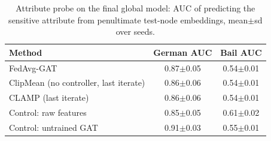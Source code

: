 \begin{table}[t]
\centering
\footnotesize
\caption{Attribute probe on the final global model: AUC of predicting the sensitive attribute from penultimate test-node embeddings, mean$\pm$sd over seeds.}
\label{tab:privacy_probe}
\begin{tabular}{lcc}
\toprule
Method & German AUC & Bail AUC \\
\midrule
FedAvg-GAT & 0.87$\pm$0.05 & 0.54$\pm$0.01 \\
ClipMean (no controller, last iterate) & 0.86$\pm$0.06 & 0.54$\pm$0.01 \\
CLAMP (last iterate) & 0.86$\pm$0.06 & 0.54$\pm$0.01 \\
Control: raw features & 0.85$\pm$0.05 & 0.61$\pm$0.02 \\
Control: untrained GAT & 0.91$\pm$0.03 & 0.55$\pm$0.01 \\
\bottomrule
\end{tabular}
\end{table}

